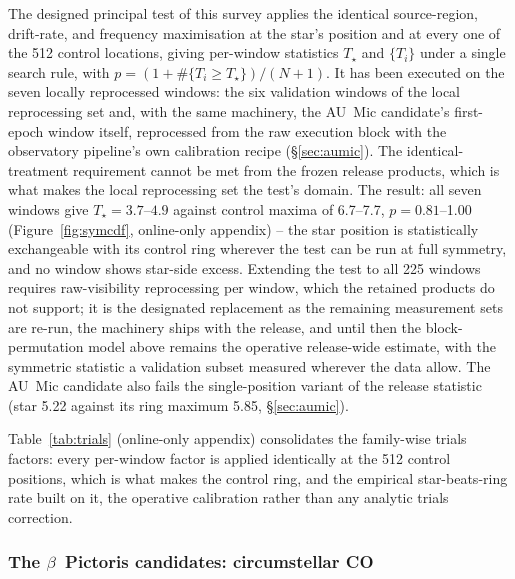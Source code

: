 \documentclass{openjournal}
\begin{document}
The designed principal test of this survey applies the identical
source-region, drift-rate, and frequency maximisation at the star's
position and at every one of the 512 control locations, giving
per-window statistics $T_\star$ and $\{T_i\}$ under a single search
rule, with $p = (1+\#\{T_i\geq T_\star\})/(N+1)$. It has been
executed on the seven locally reprocessed windows: the six validation
windows of the local reprocessing set and, with the same machinery,
the AU~Mic candidate's first-epoch window itself, reprocessed from
the raw execution block with the observatory pipeline's own
calibration recipe (\S\ref{sec:aumic}). The identical-treatment
requirement cannot be met from the frozen release products, which is
what makes the local reprocessing set the test's domain. The result:
all seven windows give $T_\star=3.7$--$4.9$ against control maxima of
6.7--7.7, $p=0.81$--1.00 (Figure~\ref{fig:symcdf}, online-only
appendix) -- the star
position is statistically exchangeable with its control ring wherever
the test can be run at full symmetry, and no window shows star-side
excess. Extending the test to all 225 windows requires
raw-visibility reprocessing per window, which the retained products
do not support; it is the designated replacement as the remaining
measurement sets are re-run, the machinery ships with the release,
and until then the block-permutation model above remains the
operative release-wide estimate, with the symmetric statistic a
validation subset measured wherever the data allow. The AU~Mic
candidate also fails the single-position variant of the release
statistic (star 5.22 against its ring maximum 5.85,
\S\ref{sec:aumic}).

Table~\ref{tab:trials} (online-only appendix) consolidates the
family-wise trials factors: every per-window factor is applied
identically at the 512 control positions, which is what makes the
control ring, and the empirical star-beats-ring rate built on it, the
operative calibration rather than any analytic trials correction.

\subsubsection*{The $\beta$~Pictoris candidates: circumstellar CO}
\end{document}
